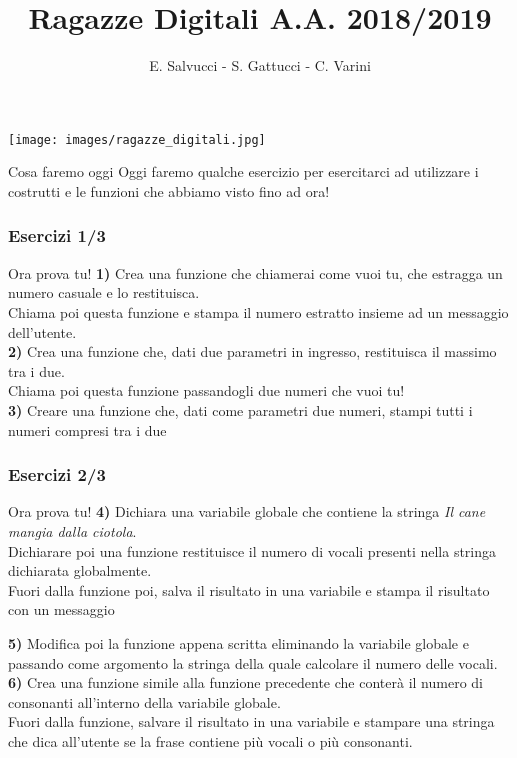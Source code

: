 \documentclass{beamer}
\title[Ragazze Digitali 2019]{Ragazze Digitali A.A. 2018/2019}
\author{E. Salvucci - S. Gattucci - C. Varini}
\date{}
\begin{document}
{\texttt{[image: images/ragazze\_digitali.jpg]}}
\begin{frame}
\end{frame}


\begin{frame}{Cosa faremo oggi}
    \vspace{0.8cm}
      Oggi faremo qualche esercizio per esercitarci ad utilizzare i costrutti e le funzioni che abbiamo visto fino ad ora!
\end{frame}


\begin{frame}[fragile]
\frametitle{Esercizi 1/3}
	\begin{block}{Ora prova tu!}
		\textbf{1)} Crea una funzione che chiamerai come vuoi tu, che estragga un numero casuale e lo restituisca.\\
		Chiama poi questa funzione e stampa il numero estratto insieme ad un messaggio dell'utente.\\
		\textbf{2)} Crea una funzione che, dati due parametri in ingresso, restituisca il massimo tra i due. \\
		Chiama poi questa funzione passandogli due numeri che vuoi tu!\\
		\textbf{3)} Creare una funzione che, dati come parametri due numeri, stampi tutti i numeri compresi tra i due\\

	\end{block}
\end{frame}

\begin{frame}[fragile]
\frametitle{Esercizi 2/3}
\begin{block}{Ora prova tu!}
	\textbf{4)} Dichiara una variabile globale che contiene la stringa \textit{Il cane mangia dalla ciotola}.\\ Dichiarare poi una funzione restituisce il numero di vocali presenti nella stringa dichiarata globalmente.\\
	Fuori dalla funzione poi, salva il risultato in una variabile e stampa il risultato con un messaggio

	\textbf{5)} Modifica poi la funzione appena scritta eliminando la variabile globale e passando come argomento la stringa della quale calcolare il numero delle vocali.\\
	\textbf{6)} Crea una funzione simile alla funzione precedente che conterà il numero di consonanti all'interno della variabile globale.\\
	Fuori dalla funzione, salvare il risultato in una variabile e stampare una stringa che dica all'utente se la frase contiene più vocali o più consonanti.\\
\end{block}
\end{frame}
\end{document}
